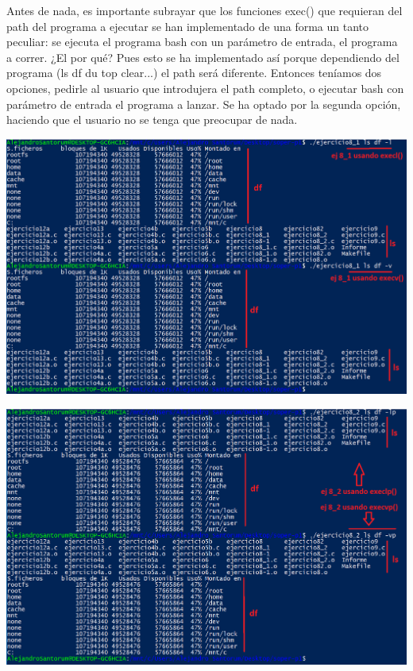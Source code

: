 \documentclass[12pt]{article}
\begin{document}
Antes de nada, es importante subrayar que los funciones exec() que requieran del path del programa a ejecutar se han implementado de una forma un tanto peculiar: se ejecuta el programa bash con un parámetro de entrada, el programa a correr. ¿El por qué? Pues esto se ha implementado así porque dependiendo del programa (ls df du top clear...) el path será diferente. Entonces teníamos dos opciones, pedirle al usuario que introdujera el path completo, o ejecutar bash con parámetro de entrada el programa a lanzar. Se ha optado por la segunda opción, haciendo que el usuario no se tenga que preocupar de nada.
\begin{center}
	\includegraphics[scale=0.8]{ej8_1.PNG}
\end{center}
\begin{center}
	\includegraphics[scale=0.8]{ej8_2.PNG}
\end{center}
\end{document}
